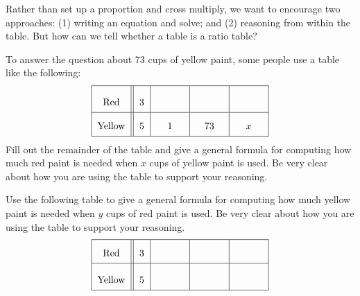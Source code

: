 \vspace{0.25in}


\begin{teachingnote}
Rather than set up a proportion and cross multiply, 
we want to encourage two approaches:  (1) writing an equation and solve; and (2) reasoning from within the table.  
But how can we tell whether a table is a ratio table?
\end{teachingnote}

\begin{prob}
To answer the question about 73 cups of yellow paint, some people use a table like the following:  
\[{\renewcommand{\arraystretch}{2}
\begin{tabular}{|c||c|c|c|c|}\hline
Red  &  3 &\rule[7mm]{10mm}{0mm} &\rule[7mm]{10mm}{0mm} & \rule[7mm]{10mm}{0mm}     \\ \hline
Yellow & 5 & 1 & 73 & $x$ \\ \hline
\end{tabular}}
\]
Fill out the remainder of the table and give a general formula for 
computing how much red paint is needed when $x$ cups of yellow 
paint is used.  Be very clear about how you 
are using the table to support your reasoning.  
\end{prob}

\begin{prob}
Use the following table to give a general formula for 
computing how much yellow paint is needed when $y$ cups of red 
paint is used.  Be very clear about how you 
are using the table to support your reasoning. 
\[{\renewcommand{\arraystretch}{2}
\begin{tabular}{|c||c|c|c|c|}\hline
Red  &  3 &  &  &     \\ \hline
Yellow & 5  &\rule[7mm]{10mm}{0mm} &\rule[7mm]{10mm}{0mm} & \rule[7mm]{10mm}{0mm} \\ \hline
\end{tabular}}
\]
\end{prob}

